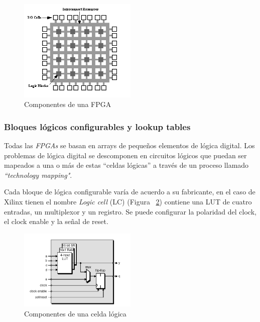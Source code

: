\begin{figure}[h!]
\begin{center}
\includegraphics[width=0.5\textwidth,keepaspectratio=true]{./images/fpga1a}
\caption{Componentes de una FPGA}
\label{fig:compfpga}
\end{center}
\end{figure}

	
\subsubsection{Bloques lógicos configurables y lookup tables}

Todas las \textit{FPGAs} se basan en arrays de pequeños elementos de
lógica digital. Los problemas de lógica digital se descomponen en
circuitos lógicos que puedan ser mapeados a una o más de estas
``celdas lógicas'' a través de un proceso llamado \textit{“technology
  mapping"}.
	
Cada bloque de lógica configurable varía de acuerdo a su fabricante,
en el caso de Xilinx tienen el nombre \textit{Logic cell} (LC) (Figura
~\ref{fig:complc}) contiene una LUT de cuatro entradas, un multiplexor
y un registro. Se puede configurar la polaridad del clock, el clock
enable y la señal de reset.

\begin{figure}[h!]
\begin{center}
\includegraphics[width=0.5\textwidth,keepaspectratio=true]{./images/celda}
\caption{Componentes de una celda lógica}
\label{fig:complc}
\end{center}
\end{figure}

